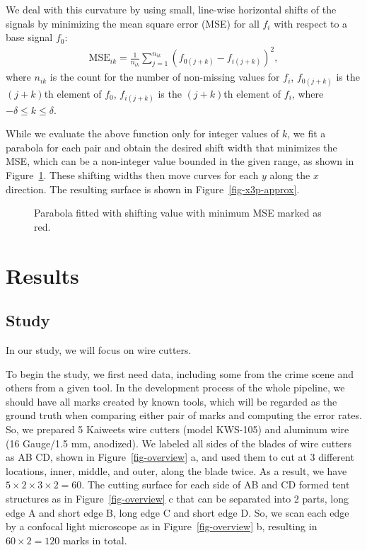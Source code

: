 \documentclass[
  authoryear,
  preprint,
  5p,
  twocolumn]{elsarticle}
\begin{document}
We deal with this curvature by using small, line-wise horizontal shifts
of the signals by minimizing the mean square error (MSE) for all \(f_i\)
with respect to a base signal \(f_0\): \begin{align*}
  \text{MSE}_{i k} =
  \frac{1}{n_{i k}} \sum_{j = 1} ^ {n_{i k}} \left(f_{0 (j+k)} - f_{i (j+k)} \right) ^ 2
  ,
\end{align*} where \(n_{i k}\) is the count for the number of
non-missing values for \(f_i\), \(f_{0 (j+k)}\) is the \((j + k)\)th
element of \(f_0\), \(f_{i (j+k)}\) is the \((j + k)\)th element of
\(f_i\), where \(-\delta \le k \le \delta\).

While we evaluate the above function only for integer values of \(k\),
we fit a parabola for each pair and obtain the desired shift width that
minimizes the MSE, which can be a non-integer value bounded in the given
range, as shown in Figure~\ref{fig-x3p-approx-MSE}. These shifting
widths then move curves for each \(y\) along the \(x\) direction. The
resulting surface is shown in Figure~\ref{fig-x3p-approx}.

\begin{figure}


\caption{\label{fig-x3p-approx-MSE}Parabola fitted with shifting value
with minimum MSE marked as red.}

\end{figure}%

\section{Results}\label{sec-Result}

\subsection{Study}\label{sec-Study}

In our study, we will focus on wire cutters.

To begin the study, we first need data, including some from the crime
scene and others from a given tool. In the development process of the
whole pipeline, we should have all marks created by known tools, which
will be regarded as the ground truth when comparing either pair of marks
and computing the error rates. So, we prepared 5 Kaiweets wire cutters
(model KWS-105) and aluminum wire (16 Gauge/1.5 mm, anodized). We
labeled all sides of the blades of wire cutters as AB CD, shown in
Figure~\ref{fig-overview} a, and used them to cut at 3 different
locations, inner, middle, and outer, along the blade twice. As a result,
we have \(5 \times 2 \times 3 \times 2 = 60\). The cutting surface for
each side of AB and CD formed tent structures as in
Figure~\ref{fig-overview} c that can be separated into 2 parts, long
edge A and short edge B, long edge C and short edge D. So, we scan each
edge by a confocal light microscope as in Figure~\ref{fig-overview} b,
resulting in \(60 \times 2 = 120\) marks in total.
\end{document}

